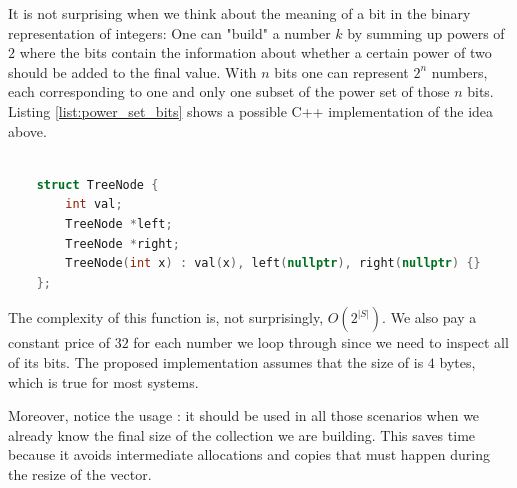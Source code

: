 It is not surprising when we think about the meaning of a bit in the binary representation of integers: One
can "build" a number $k$ by summing up powers of $2$ where the bits contain the information about whether a
certain power of two should be added to the final value. With $n$
bits one can represent $2^n$ numbers, each corresponding to one and only one subset of the power set of those $n$ bits.
Listing \ref{list:power_set_bits} shows  a possible C++ implementation of the idea above.


\begin{lstlisting}[language=c++, caption=Binary tree definition used in this exercice.,label=list:verify_BST:tree_structure]

    struct TreeNode {
        int val;
        TreeNode *left;
        TreeNode *right;
        TreeNode(int x) : val(x), left(nullptr), right(nullptr) {}
    };
    \end{lstlisting}

The complexity of this function is, not surprisingly, $O(2^{|S|})$. 
We also pay a constant price of $32$ for each number we loop through since we need to inspect all of its bits.
The proposed implementation assumes that the size of  is $4$ bytes, which is true for most systems.

Moreover, notice the usage : it should be used in all those scenarios when we already know the final size of the collection we are building. This saves time because it avoids intermediate allocations and copies that
must happen during the resize of the vector.








